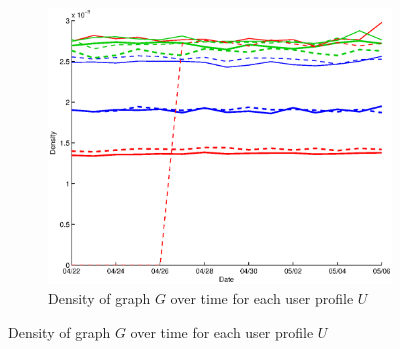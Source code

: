 \documentclass{sig-alternate}
\begin{document}
\begin{figure}
  \begin{subfigure}{.45\textwidth}
    \includegraphics[width=\textwidth]{figures/plots/density.eps}
    \caption{Density of graph $G$ over time for each user profile $U$}
    \label{fig:density}
  \end{subfigure}
  \end{figure}
\end{document}
